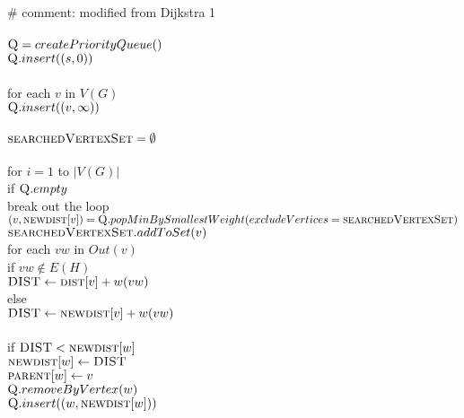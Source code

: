 \documentclass[11pt]{article}
\begin{document}
\begin{itemize}
\begin{algo}
	\+
\\[0.5ex]
\\		\# comment: modified from Dijkstra 1
\\
\\		$\textsc{Q} = createPriorityQueue()$
\\		$\textsc{Q}.insert((s,0))$
\\		
\\		for each $v$ in $V(G)$\+
\\			$\textsc{Q}.insert((v,\infty))$\-
\\
\\		$\textsc{searchedVertexSet} = \emptyset$
\\		
\\		for $i = 1$ to $|V(G)|$\+
\\			if $\textsc{Q}.empty$\+
\\				break out the loop\-
\\			$(v, \textsc{newdist}[v]) = \textsc{Q}.popMinBySmallestWeight(excludeVertices=\textsc{searchedVertexSet})$
\\			$\textsc{searchedVertexSet}.addToSet(v)$
\\			for each $vw$ in $Out(v)$\+
\\				if $vw \notin E(H)$\+
\\					$\textsc{DIST} \gets \textsc{dist}[v] + w(vw)$\-
\\				else\+
\\					$\textsc{DIST} \gets \textsc{newdist}[v] + w(vw)$\-
\\
\\				if $\textsc{DIST} < \textsc{newdist}[w]$\+
\\					$\textsc{newdist}[w] \gets \textsc{DIST}$
\\					$\textsc{parent}[w] \gets v$
\\					$\textsc{Q}.removeByVertex(w)$
\\					$\textsc{Q}.insert((w,\textsc{newdist}[w]))$\- \- \-
\\[0.5ex]
\end{algo}


\end{itemize}
\end{document}
